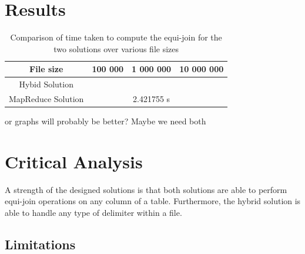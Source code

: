 \documentclass[10pt,twocolumn]{witseiepaper}
\begin{document}
%
%

\section{Results}

\begin{table} [h]
	\centering
	\caption{Comparison of time taken to compute the equi-join for the two solutions over various file sizes}
	\label{tab:results}

\begin{tabular}{|c|c|c|c|}
	\hline 
	File size & 100 000 & 1 000 000 & 10 000 000 \\ 
	\hline
	\hline 
	Hybid Solution &  &  &  \\ 
	\hline 
	MapReduce Solution &  & 2.421755 s &  \\ 
	\hline 
\end{tabular} 
\end{table}

or graphs will probably be better? Maybe we need both

\section{Critical Analysis}
A strength of the designed solutions is that both solutions are able to perform equi-join operations on any column of a table. Furthermore, the hybrid solution is able to handle any type of delimiter within a file.

\subsection{Limitations}
\end{document}

